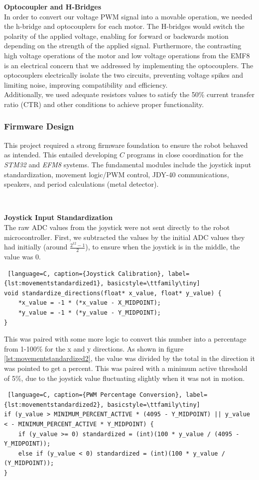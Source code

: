 \documentclass{article}
\begin{document}
\textbf{Optocoupler and H-Bridges} \\
In order to convert our voltage PWM signal into a movable operation, we needed the h-bridge and optocouplers for each motor. The H-bridges would switch the polarity of the applied voltage, enabling for forward or backwards motion depending on the strength of the applied signal. Furthermore, the contrasting high voltage operations of the motor and low voltage operations from the EMF8 is an electrical concern that we addressed by implementing the optocouplers. The optocouplers electrically isolate the two circuits, preventing voltage spikes and limiting noise, improving compatibility and efficiency. \\
Additionally, we used adequate resistors values to satisfy the 50\% current transfer ratio (CTR) and other conditions to achieve proper functionality.

\subsubsection{Firmware Design}
This project required a strong firmware foundation to ensure the robot behaved as intended. This entailed developing $C$ programs in close coordination for the \textit{STM32} and \textit{EFM8} systems.
The fundamental modules include the joystick input standardization, movement logic/PWM control, JDY-40 communications, speakers, and period calculations (metal detector).

\

\textbf{Joystick Input Standardization} \\
The raw ADC values from the joystick were not sent directly to the robot microcontroller. First, we subtracted the values by the initial ADC values they had initially (around $\frac{2^{12}-1}{2}$), to ensure when the joystick is in the middle, the value was 0.

\begin{lstlisting} [language=C, caption={Joystick Calibration}, label={lst:movementstandardized1}, basicstyle=\ttfamily\tiny]
void standardize_directions(float* x_value, float* y_value) {
    *x_value = -1 * (*x_value - X_MIDPOINT);
    *y_value = -1 * (*y_value - Y_MIDPOINT);
}
\end{lstlisting}

This was paired with some more logic to convert this number into a percentage from 1-100\% for the x and y directions. As shown in figure \ref{lst:movementstandardized2}, the value was divided by the total in the direction it was pointed to get a percent. This was paired with a minimum
 active threshold of 5\%, due to the joystick value fluctuating slightly when it was not in motion.
\begin{lstlisting} [language=C, caption={PWM Percentage Conversion}, label={lst:movementstandardized2}, basicstyle=\ttfamily\tiny]
if (y_value > MINIMUM_PERCENT_ACTIVE * (4095 - Y_MIDPOINT) || y_value < - MINIMUM_PERCENT_ACTIVE * Y_MIDPOINT) {
    if (y_value >= 0) standardized = (int)(100 * y_value / (4095 - Y_MIDPOINT));
    else if (y_value < 0) standardized = (int)(100 * y_value / (Y_MIDPOINT));
}
\end{lstlisting}
\end{document}
